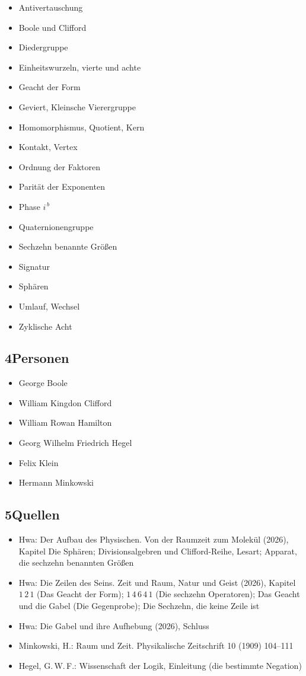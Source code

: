 \documentclass[11pt,a4paper]{article}
\begin{document}
\begin{itemize}[leftmargin=1.2em,itemsep=0pt]
\item Antivertauschung
\item Boole und Clifford
\item Diedergruppe
\item Einheitswurzeln, vierte und achte
\item Geacht der Form
\item Geviert, Kleinsche Vierergruppe
\item Homomorphismus, Quotient, Kern
\item Kontakt, Vertex
\item Ordnung der Faktoren
\item Parität der Exponenten
\item Phase $i^{\,b}$
\item Quaternionengruppe
\item Sechzehn benannte Größen
\item Signatur
\item Sphären
\item Umlauf, Wechsel
\item Zyklische Acht
\end{itemize}

\subsection*{4\quad Personen}

\begin{itemize}[leftmargin=1.2em,itemsep=0pt]
\item George Boole
\item William Kingdon Clifford
\item William Rowan Hamilton
\item Georg Wilhelm Friedrich Hegel
\item Felix Klein
\item Hermann Minkowski
\end{itemize}

\subsection*{5\quad Quellen}

\begin{itemize}[leftmargin=1.2em,itemsep=0pt]
\item Hwa: Der Aufbau des Physischen. Von der Raumzeit zum Molekül (2026), Kapitel Die Sphären; Divisionsalgebren und Clifford-Reihe, Lesart; Apparat, die sechzehn benannten Größen
\item Hwa: Die Zeilen des Seins. Zeit und Raum, Natur und Geist (2026), Kapitel $1\,2\,1$ (Das Geacht der Form); $1\,4\,6\,4\,1$ (Die sechzehn Operatoren); Das Geacht und die Gabel (Die Gegenprobe); Die Sechzehn, die keine Zeile ist
\item Hwa: Die Gabel und ihre Aufhebung (2026), Schluss
\item Minkowski, H.: Raum und Zeit. Physikalische Zeitschrift 10 (1909) 104--111
\item Hegel, G.\,W.\,F.: Wissenschaft der Logik, Einleitung (die bestimmte Negation)
\end{itemize}
\end{document}
